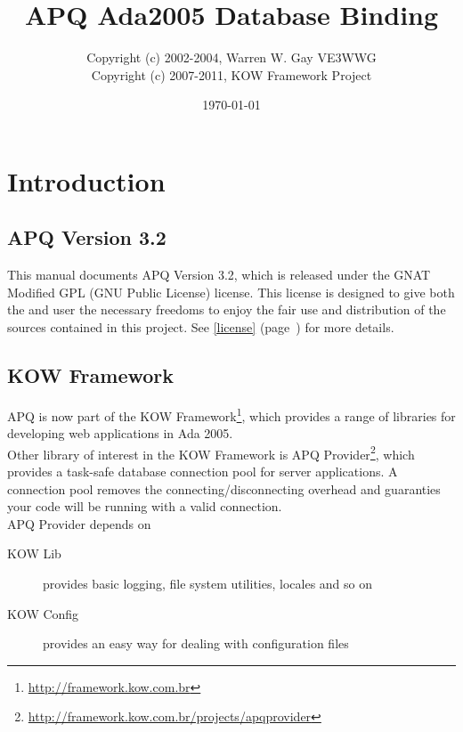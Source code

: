 \documentclass[english,letterpaper]{book}
\newcommand\Ref[1]{\textsection\ref{#1} (page~\pageref{#1})}
\newcommand\apqversion{3.2}
\begin{document}
\title{APQ Ada2005 Database Binding}
\author{%
Copyright (c) 2002-2004, Warren W. Gay VE3WWG\\%
Copyright (c) 2007-2011, KOW Framework Project
}
\date{\today}
\maketitle

\tableofcontents{}
\listoftables

\chapter{Introduction}


\section{APQ Version \apqversion}

This manual documents APQ Version \apqversion, which is released under the 
GNAT Modified GPL (GNU Public License) license. This license is designed to give both the 
and user the necessary freedoms to enjoy the fair use and distribution of the
sources  contained in this project.
See \Ref{license} for more details.


\section{KOW Framework}

APQ is now part of the KOW Framework\footnote{\url{http://framework.kow.com.br}}, which provides a
range of libraries for developing web applications in Ada 2005.\\

Other library of interest in the KOW Framework is APQ Provider\footnote{\url{http://framework.kow.com.br/projects/apqprovider}},
which provides a task-safe database connection pool for server applications. A connection pool
removes the connecting/disconnecting overhead and guaranties your code will
be running with a valid connection.\\

APQ Provider depends on

\begin{description}
	\item [KOW Lib] provides basic logging, file system utilities, locales and so on
	\item [KOW Config] provides an easy way for dealing with configuration files
\end{description}
\end{document}

